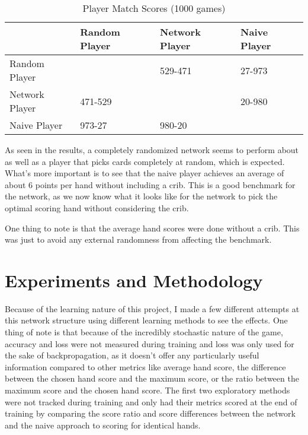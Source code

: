 \documentclass[]{article}
\begin{document}
\begin{table}[ht]
    \caption {Player Match Scores (1000 games)} \label{tbl:match_scores}
    \begin{tabular}{l|l|l|l|}
    \cline{2-4}
                                         & Random Player                                   & Network Player           & Naive Player             \\ \hline
    \multicolumn{1}{|l|}{Random Player}  & \cellcolor[HTML]{000000}                        & 529-471                  & 27-973                   \\ \hline
    \multicolumn{1}{|l|}{Network Player} & 471-529                                         & \cellcolor[HTML]{000000} & 20-980                   \\ \hline
    \multicolumn{1}{|l|}{Naive Player}   & 973-27                                          & 980-20                   & \cellcolor[HTML]{000000} \\ \hline
    \end{tabular}
\end{table}

As seen in the results, a completely randomized network seems to perform about as well as a player that picks cards completely at random, which is expected. What's more important is to see that the naive player achieves an average of about 6 points per hand without including a crib. This is a good benchmark for the network, as we now know what it looks like for the network to pick the optimal scoring hand without considering the crib.

One thing to note is that the average hand scores were done without a crib. This was just to avoid any external randomness from affecting the benchmark.

\section{Experiments and Methodology}

Because of the learning nature of this project, I made a few different attempts at this network structure using different learning methods to see the effects. One thing of note is that because of the incredibly stochastic nature of the game, accuracy and loss were not measured during training and loss was only used for the sake of backpropagation, as it doesn't offer any particularly useful information compared to other metrics like average hand score, the difference between the chosen hand score and the maximum score, or the ratio between the maximum score and the chosen hand score. The first two exploratory methods were not tracked during training and only had their metrics scored at the end of training by comparing the score ratio and score differences between the network and the naive approach to scoring for identical hands.  
\end{document}
